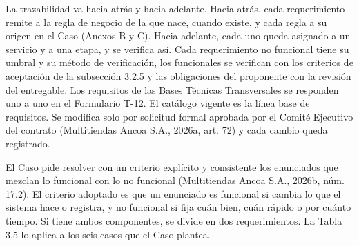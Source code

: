 \documentclass[11pt]{article}
\begin{document}
La trazabilidad va hacia atrás y hacia adelante. Hacia atrás, cada requerimiento remite a la regla de negocio de la que nace, cuando existe, y cada regla a su origen en el Caso (Anexos B y C). Hacia adelante, cada uno queda asignado a un servicio y a una etapa, y se verifica así. Cada requerimiento no funcional tiene su umbral y su método de verificación, los funcionales se verifican con los criterios de aceptación de la subsección 3.2.5 y las obligaciones del proponente con la revisión del entregable. Los requisitos de las Bases Técnicas Transversales se responden uno a uno en el Formulario T-12. El catálogo vigente es la línea base de requisitos. Se modifica solo por solicitud formal aprobada por el Comité Ejecutivo del contrato (Multitiendas Ancoa S.A., 2026a, art. 72) y cada cambio queda registrado.

El Caso pide resolver con un criterio explícito y consistente los enunciados que mezclan lo funcional con lo no funcional (Multitiendas Ancoa S.A., 2026b, núm. 17.2). El criterio adoptado es que un enunciado es funcional si cambia lo que el sistema hace o registra, y no funcional si fija cuán bien, cuán rápido o por cuánto tiempo. Si tiene ambos componentes, se divide en dos requerimientos. La Tabla 3.5 lo aplica a los seis casos que el Caso plantea.
\end{document}
